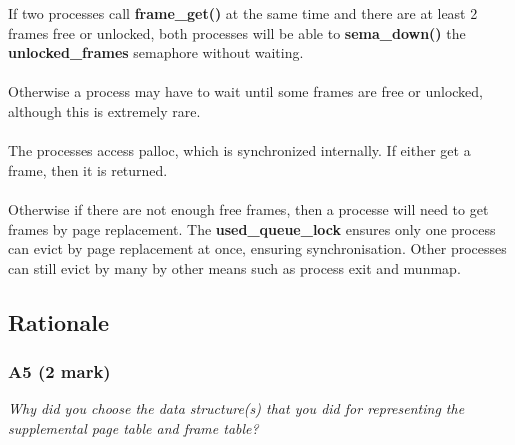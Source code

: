 \documentclass{report}
\newcommand{\question}[1]{\textit{#1} \ }
\newcommand{\fun}[1]{\textcolor{Emerald}{\textbf{#1}}}
\newcommand{\var}[1]{\textcolor{RoyalPurple}{\textbf{#1}}}
\begin{document}
				If two processes call \fun{frame\_get()} at the same time and 
				there are at least 2 frames free or unlocked, both processes 
				will be able to \fun{sema\_down()} the \var{unlocked\_frames} 
				semaphore without waiting.
				\\
				\\ Otherwise a process may have to wait until some frames are 
				free or unlocked, although this is extremely rare.
				\\
				\\ The processes access palloc, which is synchronized internally.
				If either get a frame, then it is returned.
				\\ 
				\\ Otherwise if there are not enough free frames, then a 
				processe will need to get frames by page replacement. 
				The \var{used\_queue\_lock} ensures only one process can evict 
				by page replacement at once, ensuring synchronisation. Other 
				processes can still evict by many by other means such as
				process exit and munmap.
			
		\subsection*{Rationale}
			\subsubsection*{A5 (2 mark)}
				\question{Why did you choose the data structure(s) that you did for 
				representing the supplemental page table and frame table?}
\end{document}
